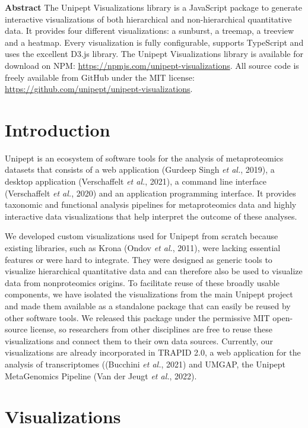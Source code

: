 \textbf{Abstract} The Unipept Visualizations library is a JavaScript
package to generate interactive visualizations of both hierarchical and
non-hierarchical quantitative data. It provides four different
visualizations: a sunburst, a treemap, a treeview and a heatmap. Every
visualization is fully configurable, supports TypeScript and uses the
excellent D3.js library. The Unipept Visualizations library is available
for download on NPM: \url{https://npmjs.com/unipept-visualizations}. All
source code is freely available from GitHub under the MIT license:
\url{https://github.com/unipept/unipept-visualizations}.

\hypertarget{introduction-4}{%
\section{Introduction}\label{introduction-4}}

Unipept is an ecosystem of software tools for the analysis of
metaproteomics datasets that consists of a web application (Gurdeep
Singh \emph{et al.}, 2019), a desktop application (Verschaffelt \emph{et
al.}, 2021), a command line interface (Verschaffelt \emph{et al.}, 2020)
and an application programming interface. It provides taxonomic and
functional analysis pipelines for metaproteomics data and highly
interactive data visualizations that help interpret the outcome of these
analyses.

We developed custom visualizations used for Unipept from scratch because
existing libraries, such as Krona (Ondov \emph{et al.}, 2011), were
lacking essential features or were hard to integrate. They were designed
as generic tools to visualize hierarchical quantitative data and can
therefore also be used to visualize data from nonproteomics origins. To
facilitate reuse of these broadly usable components, we have isolated
the visualizations from the main Unipept project and made them available
as a standalone package that can easily be reused by other software
tools. We released this package under the permissive MIT open-source
license, so researchers from other disciplines are free to reuse these
visualizations and connect them to their own data sources. Currently,
our visualizations are already incorporated in TRAPID 2.0, a web
application for the analysis of transcriptomes ((Bucchini \emph{et al.},
2021) and UMGAP, the Unipept MetaGenomics Pipeline (Van der Jeugt
\emph{et al.}, 2022).

\hypertarget{visualizations}{%
\section{Visualizations}\label{visualizations}}

